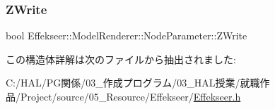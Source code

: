 \subsubsection{\texorpdfstring{Z\+Write}{ZWrite}}
{\footnotesize\ttfamily bool Effekseer\+::\+Model\+Renderer\+::\+Node\+Parameter\+::\+Z\+Write}



この構造体詳解は次のファイルから抽出されました\+:\begin{DoxyCompactItemize}
\item 
C\+:/\+H\+A\+L/\+P\+G関係/03\+\_\+作成プログラム/03\+\_\+\+H\+A\+L授業/就職作品/\+Project/source/05\+\_\+\+Resource/\+Effekseer/\mbox{\hyperlink{_effekseer_8h}{Effekseer.\+h}}\end{DoxyCompactItemize}
